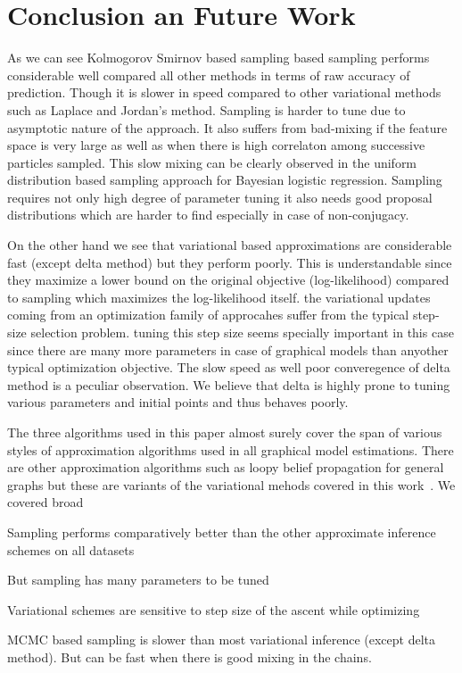 
\section{Conclusion an Future Work}
As we can see Kolmogorov Smirnov based sampling based sampling performs
considerable well compared all other methods in terms of raw accuracy of
prediction. Though it is slower in speed compared to other variational methods
such as Laplace and Jordan's method. Sampling is harder to tune due to
asymptotic nature of the approach. It also suffers from bad-mixing if the
feature space is very large as well as when there is high correlaton among
successive particles sampled. This slow mixing can be clearly observed in the
uniform distribution based sampling approach for Bayesian logistic regression.
Sampling requires not only high degree of parameter tuning it also needs good
proposal distributions which are harder to find especially in case of
non-conjugacy. 

On the other hand we see that variational based approximations are considerable
fast (except delta method) but they perform poorly. This is understandable since
they maximize a lower bound on the original objective (log-likelihood) compared
to sampling which maximizes the log-likelihood itself. the variational updates
coming from an optimization family of approcahes suffer from the typical
step-size selection problem. tuning this step size seems specially important in
this case since there are many more parameters in case of graphical models than
anyother typical optimization objective. The slow speed as well poor
converegence of delta method is a peculiar observation. We believe that delta is
highly prone to tuning various parameters and initial points and thus behaves
poorly. 

The three algorithms used in this paper almost surely cover the
span of various styles of approximation algorithms used in all graphical model
estimations. There are other approximation algorithms such as loopy belief
propagation for general graphs but these are variants of the variational mehods
covered in this work~\cite{Heskes02}. We covered broad 

Sampling performs
comparatively better than the other approximate inference schemes on all datasets

    But sampling has many parameters to be tuned

    Variational schemes are sensitive to step size of the ascent while optimizing

    MCMC based sampling is slower than most variational inference (except delta method).
    But can be fast when there is good mixing in the chains.